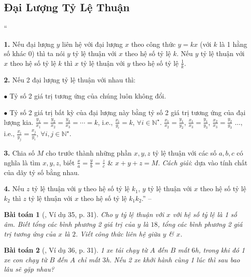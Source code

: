 \documentclass{article}
\numberwithin{equation}{section}
\newtheorem{baitoan}{Bài toán}
\begin{document}
\subsection{Đại Lượng Tỷ Lệ Thuận}
``\begin{enumerate*}
	\item[\textbf{1.}] Nếu đại lượng $y$ liên hệ với đại lượng $x$ theo công thức $y = kx$ (với $k$ là 1 hằng số khác $0$) thì ta nói $y$ tỷ lệ thuận với $x$ theo hệ số tỷ lệ $k$. Nếu $y$ tỷ lệ thuận với $x$ theo hệ số tỷ lệ $k$ thì $x$ tỷ lệ thuận với $y$ theo hệ số tỷ lệ $\frac{1}{k}$.
	\item[\textbf{2.}] Nếu 2 đại lượng tỷ lệ thuận với nhau thì:
	\begin{enumerate*}
		\item[$\bullet$] Tỷ số 2 giá trị tương ứng của chúng luôn không đổi.
		\item[$\bullet$] Tỷ số 2 giá trị bất kỳ của đại lượng này bằng tỷ số 2 giá trị tương ứng của đại lượng kia. $\frac{y_1}{x_1} = \frac{y_2}{x_2} = \frac{y_3}{x_3} = \cdots = k$, i.e., $\frac{x_i}{y_i} = k$, $\forall i\in\mathbb{N}^\star$. $\frac{x_1}{x_2} = \frac{y_1}{y_2}$, $\frac{x_1}{x_3} = \frac{y_1}{y_3}$, $\frac{x_2}{x_3} = \frac{y_2}{y_3}$ $\ldots$, i.e., $\frac{x_i}{y_j} = \frac{x_j}{y_i}$, $\forall i,j\in\mathbb{N}^\star$.
		\end{enumerate*}
	\item[\textbf{3.}] Chia số $M$ cho trước thành những phần $x,y,z$ tỷ lệ thuận với các số $a,b,c$ có nghĩa là tìm $x,y,z$, biết $\frac{x}{a} = \frac{y}{b} = \frac{z}{c}$ \& $x + y + z = M$. \textit{Cách giải}: dựa vào tính chất của dãy tỷ số bằng nhau.
	\item[\textbf{4.}] Nếu $z$ tỷ lệ thuận với $y$ theo hệ số tỷ lệ $k_1$, $y$ tỷ lệ thuận với $x$ theo hệ số tỷ lệ $k_2$ thì $z$ tỷ lệ thuận với $x$ theo hệ số tỷ lệ $k_1k_2$.'' -- \cite[Chap. 2, \S7, pp. 30--31]{Tuyen_Toan_7}
\end{enumerate*}

\begin{baitoan}[\cite{Tuyen_Toan_7}, Ví dụ 35, p. 31]
	Cho $y$ tỷ lệ thuận với $x$ với hệ số tỷ lệ là 1 số âm. Biết tổng các bình phương 2 giá trị của $y$ là $18$, tổng các bình phương 2 giá trị tương ứng của $x$ là $2$. Viết công thức liên hệ giữa $y$ \& $x$.
\end{baitoan}

\begin{baitoan}[\cite{Tuyen_Toan_7}, Ví dụ 36, p. 31]
	1 xe tải chạy từ $A$ đến $B$ mất $6$\emph{h}, trong khi đó 1 xe con chạy từ $B$ đến $A$ chỉ mất $3$\emph{h}. Nếu 2 xe khởi hành cùng 1 lúc thì sau bao lâu sẽ gặp nhau?
\end{baitoan}
\end{document}

